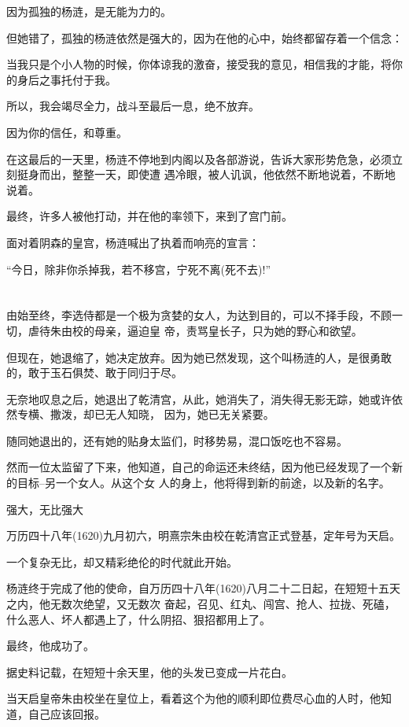 \documentclass[11pt,a4paper,onecolumn]{article}
\begin{document}
因为孤独的杨涟，是无能为力的。

但她错了，孤独的杨涟依然是强大的，因为在他的心中，始终都留存着一个信念：

当我只是个小人物的时候，你体谅我的激奋，接受我的意见，相信我的才能，将你的身后之事托付于我。

所以，我会竭尽全力，战斗至最后一息，绝不放弃。

因为你的信任，和尊重。

在这最后的一天里，杨涟不停地到内阁以及各部游说，告诉大家形势危急，必须立刻挺身而出，整整一天，即使遭
遇冷眼，被人讥讽，他依然不断地说着，不断地说着。

最终，许多人被他打动，并在他的率领下，来到了宫门前。

面对着阴森的皇宫，杨涟喊出了执着而响亮的宣言：

``今日，除非你杀掉我，若不移宫，宁死不离(死不去)!''

\section[\thesection]{}

由始至终，李选侍都是一个极为贪婪的女人，为达到目的，可以不择手段，不顾一切，虐待朱由校的母亲，逼迫皇
帝，责骂皇长子，只为她的野心和欲望。

但现在，她退缩了，她决定放弃。因为她已然发现，这个叫杨涟的人，是很勇敢的，敢于玉石俱焚、敢于同归于尽。

无奈地叹息之后，她退出了乾清宫，从此，她消失了，消失得无影无踪，她或许依然专横、撒泼，却已无人知晓，
因为，她已无关紧要。

随同她退出的，还有她的贴身太监们，时移势易，混口饭吃也不容易。

然而一位太监留了下来，他知道，自己的命运还未终结，因为他已经发现了一个新的目标--另一个女人。从这个女
人的身上，他将得到新的前途，以及新的名字。

强大，无比强大

万历四十八年(1620)九月初六，明熹宗朱由校在乾清宫正式登基，定年号为天启。

一个复杂无比，却又精彩绝伦的时代就此开始。

杨涟终于完成了他的使命，自万历四十八年(1620)八月二十二日起，在短短十五天之内，他无数次绝望，又无数次
奋起，召见、红丸、闯宫、抢人、拉拢、死磕，什么恶人、坏人都遇上了，什么阴招、狠招都用上了。

最终，他成功了。

据史料记载，在短短十余天里，他的头发已变成一片花白。

当天启皇帝朱由校坐在皇位上，看着这个为他的顺利即位费尽心血的人时，他知道，自己应该回报。
\end{document}
